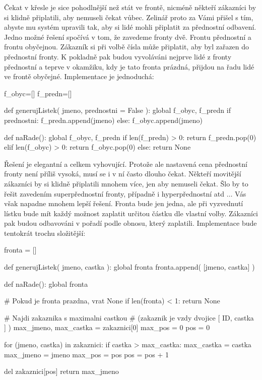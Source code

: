Čekat v křesle je sice pohodlnější než stát ve frontě, nicméně někteří zákazníci by si klidně připlatili, aby nemuseli čekat vůbec. Zelinář proto
za Vámi přišel s tím, abyste mu systém upravili tak, aby si lidé mohli připlatit za přednostní odbavení. Jedno možné řešení spočívá v tom, že zavedeme
fronty dvě. Frontu přednostní a frontu obyčejnou. Zákazník si při volbě čísla může připlatit, aby byl zařazen do přednostní fronty. K pokladně pak budou
vyvoláváni nejprve lidé z fronty přednostní a teprve v okamžiku, kdy je tato fronta prázdná, přijdou na řadu lidé ve frontě obyčejné. Implementace
je jednoduchá:

\begin{python}
f_obyc=[]
f_predn=[]

def generujListek( jmeno, prednostni = False ):
    global f_obyc, f_predn
    if prednostni:
        f_predn.append(jmeno)
    else:
        f_obyc.append(jmeno)

def naRade():
    global f_obyc, f_predn
    if len(f_predn) > 0:
        return f_predn.pop(0)
    elif len(f_obyc) > 0:
        return f_obyc.pop(0)
    else:
        return None
\end{python}

Řešení je elegantní a celkem vyhovující. Protože ale nastavená cena přednostní fronty není příliš vysoká, musí se i v ní často dlouho čekat.
Někteří movitější zákazníci by si klidně připlatili mnohem více, jen aby nemuseli čekat. Šlo by to řešit zavedením superpřednostní fronty, případně
i hyperpřednostní atd $\ldots$ Vás však napadne mnohem lepší řešení. Fronta bude jen jedna, ale při vyzvednutí lístku bude mít každý možnost zaplatit
určitou částku dle vlastní volby. Zákazníci pak budou odbavováni v pořadí podle obnosu, který zaplatili. Implementace bude tentokrát trochu
složitější:


\begin{python}
fronta = []

def generujListek( jmeno, castka ):
    global fronta
    fronta.append( [jmeno, castka] )


def naRade():
    global fronta

    # Pokud je fronta prazdna, vrat None
    if len(fronta) < 1:
      return None

    # Najdi zakaznika s maximalni castkou
    # (zakaznik je vzdy dvojice [ ID, castka ] )
    max_jmeno, max_castka = zakaznici[0]
    max_pos    = 0
    pos        = 0

    for (jmeno, castka) in zakaznici:
        if castka > max_castka:
	    max_castka = castka
            max_jmeno = jmeno
            max_pos = pos
        pos = pos + 1

    del zakaznici[pos]
    return max_jmeno
\end{python}


